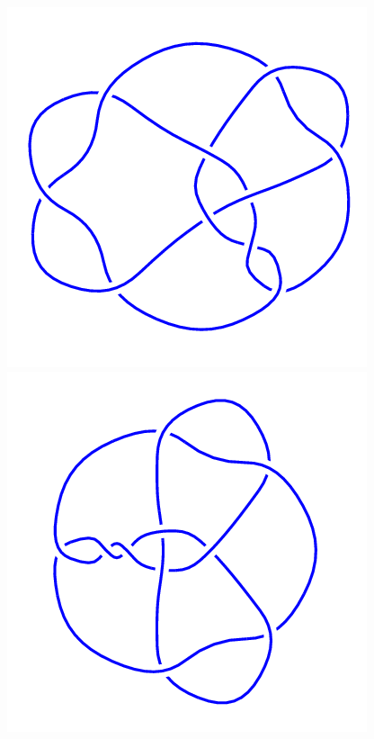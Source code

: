 \begin{figure}[H]
    \begin{minipage}[b]{.18\linewidth}
        \centering
        \includegraphics[width=\linewidth]{../data/10_102.png}
    \end{minipage}
    \begin{minipage}[b]{.18\linewidth}
        \centering
        \includegraphics[width=\linewidth]{../data/10_103.png}

\end{minipage}
\end{figure}
